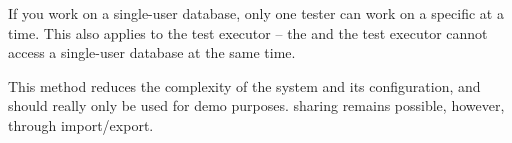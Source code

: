 If you work on a single-user database, only one tester can  work on a specific \gdproject{} at a time. 
This also applies to the test executor -- the \ite{} and the test executor cannot access a single-user database at the same time.

This method reduces the complexity of the system and its configuration, 
and should really only be used for demo purposes. 
\gdproject{} sharing remains possible, however, through import/export.

